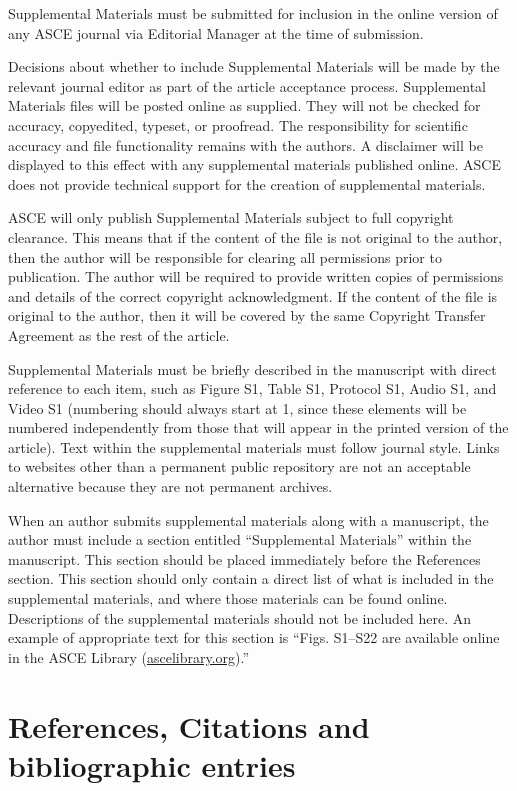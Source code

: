 \documentclass[Journal,letterpaper]{ascelike-new}
\begin{document}
Supplemental Materials must be submitted for inclusion in the online version of any ASCE journal via Editorial Manager at the time of submission.

Decisions about whether to include Supplemental Materials will be made by the relevant journal editor as part of the article acceptance process. Supplemental Materials files will be posted online as supplied. They will not be checked for accuracy, copyedited, typeset, or proofread. The responsibility for scientific accuracy and file functionality remains with the authors. A disclaimer will be displayed to this effect with any supplemental materials published online. ASCE does not provide technical support for the creation of supplemental materials.

ASCE will only publish Supplemental Materials subject to full copyright clearance. This means that if the content of the file is not original to the author, then the author will be responsible for clearing all permissions prior to publication. The author will be required to provide written copies of permissions and details of the correct copyright acknowledgment. If the content of the file is original to the author, then it will be covered by the same Copyright Transfer Agreement as the rest of the article.

Supplemental Materials must be briefly described in the manuscript with direct reference to each item, such as Figure S1, Table S1, Protocol S1, Audio S1, and Video S1 (numbering should always start at 1, since these elements will be numbered independently from those that will appear in the printed version of the article). Text within the supplemental materials must follow journal style. Links to websites other than a permanent public repository are not an acceptable alternative because they are not permanent archives.

When an author submits supplemental materials along with a manuscript, the author must include a section entitled ``Supplemental Materials'' within the manuscript. This section should be placed immediately before the References section. This section should only contain a direct list of what is included in the supplemental materials, and where those materials can be found online. Descriptions of the supplemental materials should not be included here. An example of appropriate text for this section is ``Figs. S1–S22 are available online in the ASCE Library (\href{http://ascelibrary.org/}{ascelibrary.org}).''

\section{References, Citations and bibliographic entries}
\end{document}
